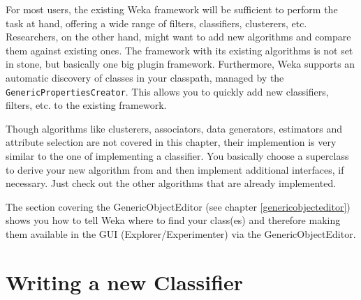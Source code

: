 %
%
%
%


For most users, the existing Weka framework will be sufficient to perform the
task at hand, offering a wide range of filters, classifiers, clusterers, etc.
Researchers, on the other hand, might want to add new algorithms and compare
them against existing ones. The framework with its existing algorithms is not
set in stone, but basically one big plugin framework. Furthermore, Weka supports
an automatic discovery of classes in your classpath, managed by the
\texttt{GenericPropertiesCreator}. This allows you to quickly add new
classifiers, filters, etc. to the existing framework.

Though algorithms like clusterers, associators, data generators, estimators and
attribute selection are not covered in this chapter, their implemention is very
similar to the one of implementing a classifier. You basically choose a
superclass to derive your new algorithm from and then implement additional
interfaces, if necessary. Just check out the other algorithms that are already
implemented.

The section covering the GenericObjectEditor (see chapter
\ref{genericobjecteditor}) shows you how to tell Weka where to find your
class(es) and therefore making them available in the GUI
(Explorer/Experimenter) via the GenericObjectEditor.


\newpage
\section{Writing a new Classifier}
